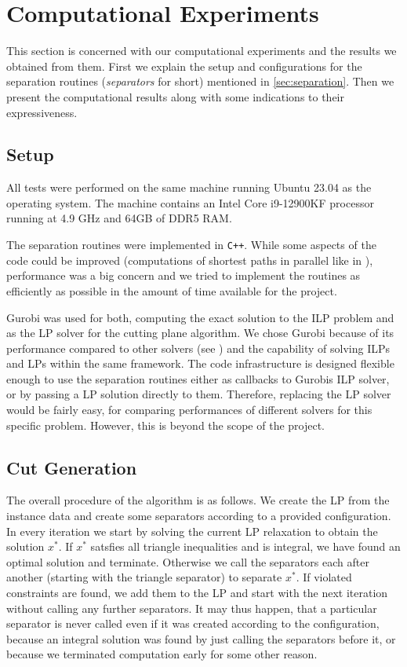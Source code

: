 \section{Computational Experiments}\label{sec:experiments}
This section is concerned with our computational experiments and the results we obtained from them.
First we explain the setup and configurations for the separation routines (\textit{separators} for short) mentioned in \cref{sec:separation}.
Then we present the computational results along with some indications to their expressiveness.

\subsection{Setup}\label{subsec:experiments_setup}
All tests were performed on the same machine running Ubuntu 23.04 as the operating system.
The machine contains an Intel Core i9-12900KF processor running at 4.9 GHz and 64GB of DDR5 RAM. 

The separation routines were implemented in \texttt{C++}.
While some aspects of the code could be improved (\eg computations of shortest paths in parallel like in \cite{sorensenSeparationHeuristic2Partition2020}),
performance was a big concern and we tried to implement the routines as efficiently as possible in the amount of time available for the project.

Gurobi \cite{gurobioptimizationllcGurobiOptimizerReference2023} was used for both, computing the exact solution to the ILP problem and as the LP solver for the cutting plane algorithm.
We chose Gurobi because of its performance compared to other solvers (see \cite{meindlAnalysisCommercialFree2012}) and the capability of solving ILPs and LPs within the same framework.
The code infrastructure is designed flexible enough to use the separation routines either as callbacks to Gurobis ILP solver, or by passing a LP solution directly to them.
Therefore, replacing the LP solver would be fairly easy, \eg for comparing performances of different solvers for this specific problem.
However, this is beyond the scope of the project.

\subsection{Cut Generation}\label{subsec:cut_generation}
The overall procedure of the algorithm is as follows.
We create the LP from the instance data and create some separators according to a provided configuration.
In every iteration we start by solving the current LP relaxation to obtain the solution $x^{*}$.
If $x^{*}$ satsfies all triangle inequalities and is integral, we have found an optimal solution and terminate.
Otherwise we call the separators each after another (starting with the triangle separator) to separate $x^{*}$.
If violated constraints are found, we add them to the LP and start with the next iteration without calling any further separators.
It may thus happen, that a particular separator is never called even if it was created according to the configuration,
\eg because an integral solution was found by just calling the separators before it, or because we terminated computation early for some other reason.

